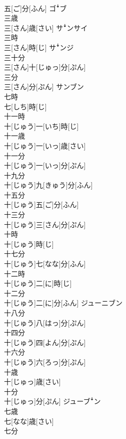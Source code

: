 \documentclass[8pt]{extreport}
\begin{document}
\begin{CJK}{UTF8}{min}
\\	五[ご]分[ふん]	ゴꜜブ
\\	三歳	
\\	三[さん]歳[さい]	サꜜンサイ
\\	三時	
\\	三[さん]時[じ]	サꜜンジ
\\	三十分	
\\	三[さん]十[じゅっ]分[ぷん]	
\\	三分	
\\	三[さん]分[ぷん]	サンブン
\\	七時	
\\	七[しち]時[じ]	
\\	十一時	
\\	十[じゅう]一[いち]時[じ]	
\\	十一歳	
\\	十[じゅう]一[いっ]歳[さい]	
\\	十一分	
\\	十[じゅう]一[いっ]分[ぷん]	
\\	十九分	
\\	十[じゅう]九[きゅう]分[ふん]	
\\	十五分	
\\	十[じゅう]五[ご]分[ふん]	
\\	十三分	
\\	十[じゅう]三[さん]分[ぷん]	
\\	十時	
\\	十[じゅう]時[じ]	
\\	十七分	
\\	十[じゅう]七[なな]分[ふん]	
\\	十二時	
\\	十[じゅう]二[に]時[じ]	
\\	十二分	
\\	十[じゅう]二[に]分[ふん]	ジューニブン
\\	十八分	
\\	十[じゅう]八[はっ]分[ぷん]	
\\	十四分	
\\	十[じゅう]四[よん]分[ぷん]	
\\	十六分	
\\	十[じゅう]六[ろっ]分[ぷん]	
\\	十歳	
\\	十[じゅっ]歳[さい]	
\\	十分	
\\	十[じゅっ]分[ぷん]	ジューブꜜン
\\	七歳	
\\	七[なな]歳[さい]	
\\	七分	

\end{CJK}
\end{document}
